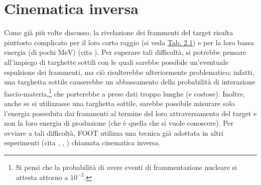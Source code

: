 \documentclass[12pt,a4paper,twoside]{report}
\begin{document}
	\section{Cinematica inversa}\label{sec:cinematica_inversa}
	Come già più volte discusso, la rivelazione dei frammenti del target risulta piuttosto complicato per il loro corto raggio (si veda \hyperref[tab:range]{Tab. 2.1}) e per la loro bassa energia (di pochi $\mbox{MeV}$) (cita
	). Per superare tali difficoltà, si potrebbe pensare all'impiego di targhette sottili con le quali sarebbe possibile un'eventuale espulsione dei frammenti, ma ciò risulterebbe ulteriormente problematico; infatti, una targhetta sottile causerebbe un abbassamento della probabilità di interazione fascio-materia,\footnote{Si pensi che la probabilità di avere eventi di frammentazione nucleare si attesta attorno a $10^{-2}$.} che porterebbe a prese dati troppo lunghe (e costose). Inoltre, anche se si utilizzasse una targhetta sottile, sarebbe possibile misurare solo l'energia posseduta dai frammenti al termine del loro attraversamento del target e non la loro energia di produzione (che è quella che si vuole conoscere). Per ovviare a tali difficoltà, FOOT utilizza una tecnica già adottata in altri esperimenti (cita
	,
	,
	) chiamata cinematica inversa.
\end{document}
